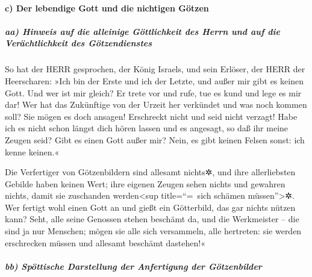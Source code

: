 \hypertarget{c-der-lebendige-gott-und-die-nichtigen-guxf6tzen}{%
\paragraph{c) Der lebendige Gott und die nichtigen
Götzen}\label{c-der-lebendige-gott-und-die-nichtigen-guxf6tzen}}

\hypertarget{aa-hinweis-auf-die-alleinige-guxf6ttlichkeit-des-herrn-und-auf-die-veruxe4chtlichkeit-des-guxf6tzendienstes}{%
\subparagraph{aa) Hinweis auf die alleinige Göttlichkeit des Herrn und
auf die Verächtlichkeit des
Götzendienstes}\label{aa-hinweis-auf-die-alleinige-guxf6ttlichkeit-des-herrn-und-auf-die-veruxe4chtlichkeit-des-guxf6tzendienstes}}

So hat der HERR gesprochen, der König Israels, und sein
Erlöser, der HERR der Heerscharen: »Ich bin der Erste und ich der
Letzte, und außer mir gibt es keinen Gott. Und wer ist mir
gleich? Er trete vor und rufe, tue es kund und lege es mir dar! Wer hat
das Zukünftige von der Urzeit her verkündet und was noch kommen soll?
Sie mögen es doch ansagen! Erschreckt nicht und seid nicht
verzagt! Habe ich es nicht schon längst dich hören lassen und es
angesagt, so daß ihr meine Zeugen seid? Gibt es einen Gott außer mir?
Nein, es gibt keinen Felsen sonst: ich kenne keinen.«

Die Verfertiger von Götzenbildern sind allesamt nichts✲,
und ihre allerliebsten Gebilde haben keinen Wert; ihre eigenen Zeugen
sehen nichts und gewahren nichts, damit sie zuschanden
werden\textless sup title=``=~sich schämen müssen''\textgreater✲.
Wer fertigt wohl einen Gott an und gießt ein Götterbild,
das gar nichts nützen kann? Seht, alle seine Genossen
stehen beschämt da, und die Werkmeister -- die sind ja nur Menschen;
mögen sie alle sich versammeln, alle hertreten: sie werden erschrecken
müssen und allesamt beschämt dastehen!«

\hypertarget{bb-spuxf6ttische-darstellung-der-anfertigung-der-guxf6tzenbilder}{%
\subparagraph{bb) Spöttische Darstellung der Anfertigung der
Götzenbilder}\label{bb-spuxf6ttische-darstellung-der-anfertigung-der-guxf6tzenbilder}}

